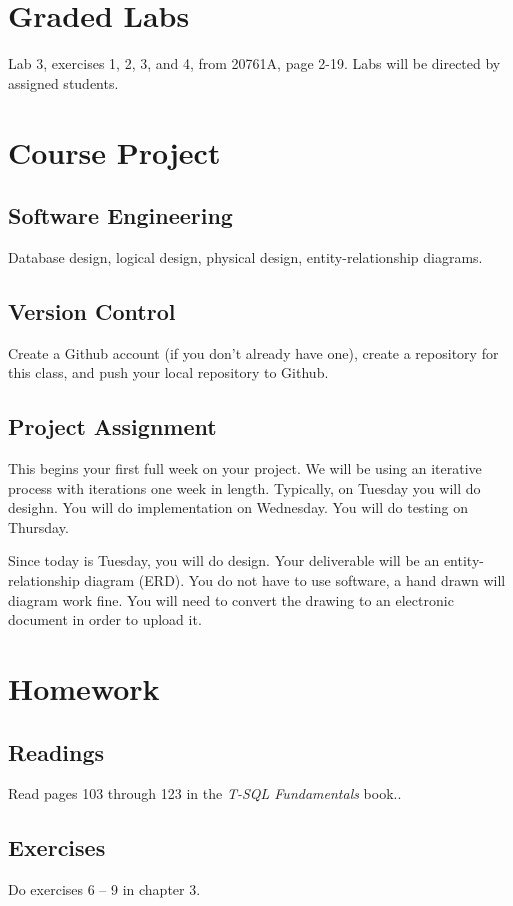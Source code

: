 \documentclass{article}
\begin{document}
    \section{Graded Labs}

Lab 3, exercises 1, 2, 3, and 4, from 20761A, page 2-19. Labs will be directed by assigned students.



    \section{Course Project}


        \subsection{Software Engineering}

        Database design, logical design, physical design, entity-relationship diagrams.
        
        \subsection{Version Control}

        Create a Github account (if you don't already have one), create a repository for this class, and push your local repository to Github.

        \subsection{Project Assignment}

        This begins your first full week on your project. We will be using an iterative process with iterations one week in length. Typically, on Tuesday you will do desighn. You will do implementation on Wednesday. You will do testing on Thursday.

        Since today is Tuesday, you will do design. Your deliverable will be an entity-relationship diagram (ERD). You do not have to use software, a hand drawn will diagram work fine. You will need to convert the drawing to an electronic document in order to upload it.  

    \section{Homework}


        \subsection{Readings}

        Read pages 103 through 123 in the \textit{T-SQL Fundamentals} book..
        
        \subsection{Exercises}

        Do exercises 6 -- 9 in chapter 3.
\end{document}
